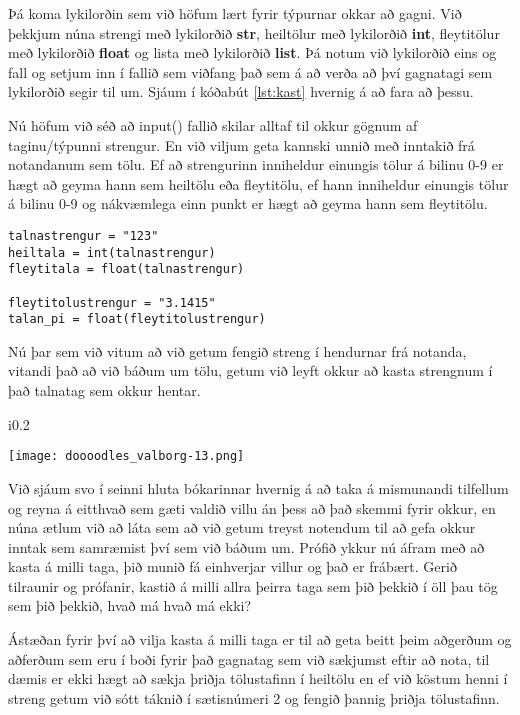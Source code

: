Þá koma lykilorðin sem við höfum lært fyrir týpurnar okkar að gagni.
Við þekkjum núna strengi með lykilorðið \textbf{str}, heiltölur með lykilorðið \textbf{int}, fleytitölur með lykilorðið \textbf{float} og lista með lykilorðið \textbf{list}.
Þá notum við lykilorðið eins og fall og setjum inn í fallið sem viðfang það sem á að verða að því gagnatagi sem lykilorðið segir til um.
Sjáum í kóðabút \ref{lst:kast} hvernig á að fara að þessu.

Nú höfum við séð að input() fallið skilar alltaf til okkur gögnum af taginu/týpunni strengur.
En við viljum geta kannski unnið með inntakið frá notandanum sem tölu.
Ef að strengurinn inniheldur einungis tölur á bilinu 0-9 er hægt að geyma hann sem heiltölu eða fleytitölu, ef hann inniheldur einungis tölur á bilinu 0-9 og nákvæmlega einn punkt er hægt að geyma hann sem fleytitölu.


\begin{lstlisting}[caption=Hvernig á að kasta á milli gagnataga, label=lst:kast]
talnastrengur = "123"
heiltala = int(talnastrengur)
fleytitala = float(talnastrengur)

fleytitolustrengur = "3.1415"
talan_pi = float(fleytitolustrengur)
\end{lstlisting}

Nú þar sem við vitum að við getum fengið streng í hendurnar frá notanda, vitandi það að við báðum um tölu, getum við leyft okkur að kasta strengnum í það talnatag sem okkur hentar.
\begin{wrapfigure}{i}{0.2\textwidth} %
	\begin{center}
		\texttt{[image: doooodles\_valborg-13.png]}
	\end{center}
\end{wrapfigure}
Við sjáum svo í seinni hluta bókarinnar hvernig á að taka á mismunandi tilfellum og reyna á eitthvað sem gæti valdið villu án þess að það skemmi fyrir okkur, en núna ætlum við að láta sem að við getum treyst notendum til að gefa okkur inntak sem samræmist því sem við báðum um.
Prófið ykkur nú áfram með að kasta á milli taga, þið munið fá einhverjar villur og það er frábært.
Gerið tilraunir og prófanir, kastið á milli allra þeirra taga sem þið þekkið í öll þau tög sem þið þekkið, hvað má hvað má ekki?

Ástæðan fyrir því að vilja kasta á milli taga er til að geta beitt þeim aðgerðum og aðferðum sem eru í boði fyrir það gagnatag sem við sækjumst eftir að nota, til dæmis er ekki hægt að sækja þriðja tölustafinn í heiltölu en ef við köstum henni í streng getum við sótt táknið í sætisnúmeri 2 og fengið þannig þriðja tölustafinn.

